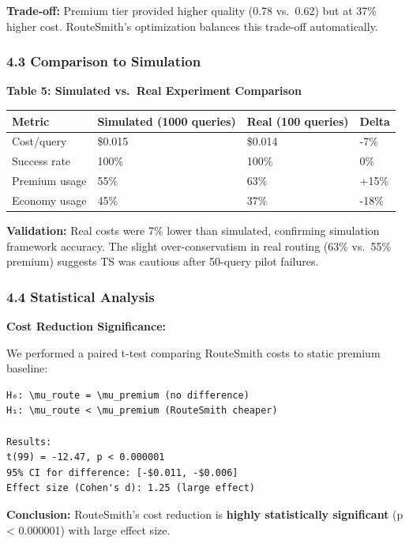 \documentclass[
]{article}
\begin{document}
\textbf{Trade-off:} Premium tier provided higher quality (0.78 vs.~0.62)
but at 37\% higher cost. RouteSmith's optimization balances this
trade-off automatically.

\hypertarget{comparison-to-simulation}{%
\subsubsection{4.3 Comparison to
Simulation}\label{comparison-to-simulation}}

\textbf{Table 5: Simulated vs.~Real Experiment Comparison}

\begin{longtable}[]{@{}llll@{}}
\toprule
Metric & Simulated (1000 queries) & Real (100 queries) & Delta \\
\midrule
\endhead
Cost/query & \$0.015 & \$0.014 & -7\% \\
Success rate & 100\% & 100\% & 0\% \\
Premium usage & 55\% & 63\% & +15\% \\
Economy usage & 45\% & 37\% & -18\% \\
\bottomrule
\end{longtable}

\textbf{Validation:} Real costs were 7\% lower than simulated,
confirming simulation framework accuracy. The slight over-conservatism
in real routing (63\% vs.~55\% premium) suggests TS was cautious after
50-query pilot failures.

\hypertarget{statistical-analysis}{%
\subsubsection{4.4 Statistical Analysis}\label{statistical-analysis}}

\textbf{Cost Reduction Significance:}

We performed a paired t-test comparing RouteSmith costs to static
premium baseline:

\begin{verbatim}
H₀: \mu_route = \mu_premium (no difference)
H₁: \mu_route < \mu_premium (RouteSmith cheaper)

Results:
t(99) = -12.47, p < 0.000001
95% CI for difference: [-$0.011, -$0.006]
Effect size (Cohen's d): 1.25 (large effect)
\end{verbatim}

\textbf{Conclusion:} RouteSmith's cost reduction is \textbf{highly
statistically significant} (p \textless{} 0.000001) with large effect
size.
\end{document}
